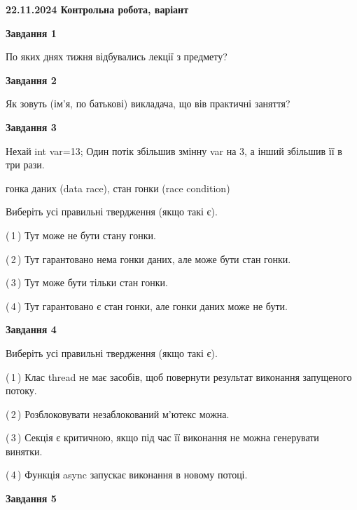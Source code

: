 \documentclass[12pt, ukrainian]{article}
\begin{document}
\begin {large}

\textbf{22.11.2024 Контрольна робота, варіант  }\par


{

\begin{center}
\textbf{Завдання 1}
\end{center}

По яких днях тижня відбувались лекції з предмету?


\begin{center}
\textbf{Завдання 2}
\end{center}

Як зовуть (ім'я, по батькові) викладача, що вів практичні заняття?


\begin{center}
\textbf{Завдання 3}
\end{center}

Нехай int var=13; Один потік збільшив змінну var на 3, а інший збільшив її в три рази.

гонка даних (data race), стан гонки (race condition)

Виберіть усі правильні твердження (якщо такі є).\par
\vspace{2mm}
(\,1\,) Тут може не бути стану гонки.%

(\,2\,) Тут гарантовано нема гонки даних, але може бути стан гонки.%

(\,3\,) Тут може бути тільки стан гонки.%

(\,4\,) Тут гарантовано є стан гонки, але гонки даних може не бути.%


\begin{center}
\textbf{Завдання 4}
\end{center}

Виберіть усі правильні твердження (якщо такі є).\par
\vspace{2mm}

(\,1\,) Клас thread не має засобів, щоб повернути результат виконання запущеного потоку.%

(\,2\,) Розблоковувати незаблокований м’ютекс можна.%

(\,3\,) Секція є критичною, якщо під час її виконання не можна генерувати винятки.%

(\,4\,) Функція async запускає виконання в новому потоці.%


\begin{center}
\textbf{Завдання 5}
\end{center}

}
\end{large}
\end{document}
